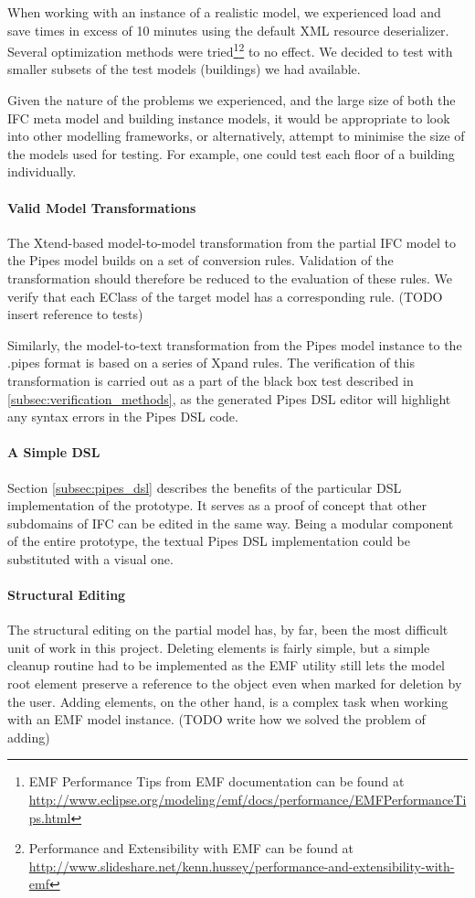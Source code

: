 When working with an instance of a realistic model, we experienced load and save times in excess of 10 minutes using the default XML resource deserializer. Several optimization methods were tried\footnote{EMF Performance Tips from EMF documentation can be found at \url{http://www.eclipse.org/modeling/emf/docs/performance/EMFPerformanceTips.html}}\footnote{Performance and Extensibility with EMF can be found at \url{http://www.slideshare.net/kenn.hussey/performance-and-extensibility-with-emf}} to no effect. We decided to test with smaller subsets of the test models (buildings) we had available.

Given the nature of the problems we experienced, and the large size of both the IFC meta model and building instance models, it would be appropriate to look into other modelling frameworks, or alternatively, attempt to minimise the size of the models used for testing. For example, one could test each floor of a building individually.

\paragraph{Valid Model Transformations} The Xtend-based model-to-model transformation from the partial IFC model to the Pipes model builds on a set of conversion rules. Validation of the transformation should therefore be reduced to the evaluation of these rules. We verify that each EClass of the target model has a corresponding rule. (TODO insert reference to tests) 

Similarly, the model-to-text transformation from the Pipes model instance to the .pipes format is based on a series of Xpand rules. The verification of this transformation is carried out as a part of the black box test described in \ref{subsec:verification_methods}, as the generated Pipes DSL editor will highlight any syntax errors in the Pipes DSL code.

\paragraph{A Simple DSL} Section \ref{subsec:pipes_dsl} describes the benefits of the particular DSL implementation of the prototype. It serves as a proof of concept that other subdomains of IFC can be edited in the same way. Being a modular component of the entire prototype, the textual Pipes DSL implementation could be substituted with a visual one.

\paragraph{Structural Editing} The structural editing on the partial model has, by far, been the most difficult unit of work in this project. Deleting elements is fairly simple, but a simple cleanup routine had to be implemented as the EMF utility still lets the model root element preserve a reference to the object even when marked for deletion by the user. Adding elements, on the other hand, is a complex task when working with an EMF model instance. (TODO write how we solved the problem of adding)


